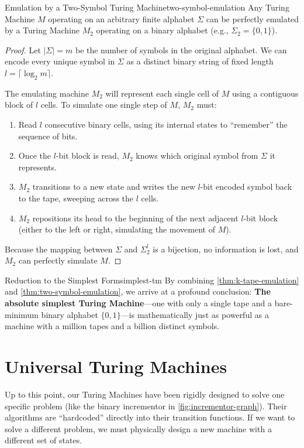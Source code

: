 \begin{theorem}{Emulation by a Two-Symbol Turing Machine}{two-symbol-emulation}
    Any Turing Machine \(M\) operating on an arbitrary finite alphabet \(\Sigma\) can be perfectly emulated by a Turing Machine \(M_2\) operating on a binary alphabet (e.g., \(\Sigma_2 = \{0, 1\}\)).
    \begin{proof}
        Let \(|\Sigma| = m\) be the number of symbols in the original alphabet. We can encode every unique symbol in \(\Sigma\) as a distinct binary string of fixed length \(l = \lceil \log_2 m \rceil\). 
        
        The emulating machine \(M_2\) will represent each single cell of \(M\) using a contiguous block of \(l\) cells. To simulate one single step of \(M\), \(M_2\) must:
        \begin{enumerate}
            \item Read \(l\) consecutive binary cells, using its internal states to ``remember'' the sequence of bits.
            \item Once the \(l\)-bit block is read, \(M_2\) knows which original symbol from \(\Sigma\) it represents.
            \item \(M_2\) transitions to a new state and writes the new \(l\)-bit encoded symbol back to the tape, sweeping across the \(l\) cells.
            \item \(M_2\) repositions its head to the beginning of the next adjacent \(l\)-bit block (either to the left or right, simulating the movement of \(M\)).
        \end{enumerate}
        Because the mapping between \(\Sigma\) and \(\Sigma_2^l\) is a bijection, no information is lost, and \(M_2\) can perfectly simulate \(M\).
    \end{proof}
\end{theorem}

\begin{observation}{Reduction to the Simplest Form}{simplest-tm}
    By combining \cref{thm:k-tape-emulation} and \cref{thm:two-symbol-emulation}, we arrive at a profound conclusion: \textbf{The absolute simplest Turing Machine}—one with only a single tape and a bare-minimum binary alphabet \(\{0,1\}\)—is mathematically just as powerful as a machine with a million tapes and a billion distinct symbols.
\end{observation}

\section{Universal Turing Machines}
Up to this point, our Turing Machines have been rigidly designed to solve one specific problem (like the binary incrementor in \cref{fig:incrementor-graph}). Their algorithms are ``hardcoded'' directly into their transition functions. If we want to solve a different problem, we must physically design a new machine with a different set of states.


